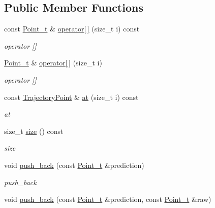 \subsection*{Public Member Functions}
\begin{DoxyCompactItemize}
\item 
const \mbox{\hyperlink{defines_8h_a8c42696da8f098b91374a8e8bb84b430}{Point\+\_\+t}} \& \mbox{\hyperlink{class_trace_a0ed863dc4071b9081b45787ebccc7e07}{operator\mbox{[}$\,$\mbox{]}}} (size\+\_\+t i) const
\begin{DoxyCompactList}\small\item\em operator \mbox{[}\mbox{]} \end{DoxyCompactList}\item 
\mbox{\hyperlink{defines_8h_a8c42696da8f098b91374a8e8bb84b430}{Point\+\_\+t}} \& \mbox{\hyperlink{class_trace_a8b3c9ff4a1eef9356c7bd649a2f27cc7}{operator\mbox{[}$\,$\mbox{]}}} (size\+\_\+t i)
\begin{DoxyCompactList}\small\item\em operator \mbox{[}\mbox{]} \end{DoxyCompactList}\item 
const \mbox{\hyperlink{struct_trajectory_point}{Trajectory\+Point}} \& \mbox{\hyperlink{class_trace_a275e31cde73ea1ba7f51c17191aefcd5}{at}} (size\+\_\+t i) const
\begin{DoxyCompactList}\small\item\em at \end{DoxyCompactList}\item 
size\+\_\+t \mbox{\hyperlink{class_trace_a1bc7111ffb39ba415c2553677fc2f3ba}{size}} () const
\begin{DoxyCompactList}\small\item\em size \end{DoxyCompactList}\item 
void \mbox{\hyperlink{class_trace_a5bca62bb3439cd12991f848a875d4085}{push\+\_\+back}} (const \mbox{\hyperlink{defines_8h_a8c42696da8f098b91374a8e8bb84b430}{Point\+\_\+t}} \&prediction)
\begin{DoxyCompactList}\small\item\em push\+\_\+back \end{DoxyCompactList}\item 
void \mbox{\hyperlink{class_trace_ae7696e9f00fd53dbef9a122d913f4965}{push\+\_\+back}} (const \mbox{\hyperlink{defines_8h_a8c42696da8f098b91374a8e8bb84b430}{Point\+\_\+t}} \&prediction, const \mbox{\hyperlink{defines_8h_a8c42696da8f098b91374a8e8bb84b430}{Point\+\_\+t}} \&raw)

\end{DoxyCompactItemize}
